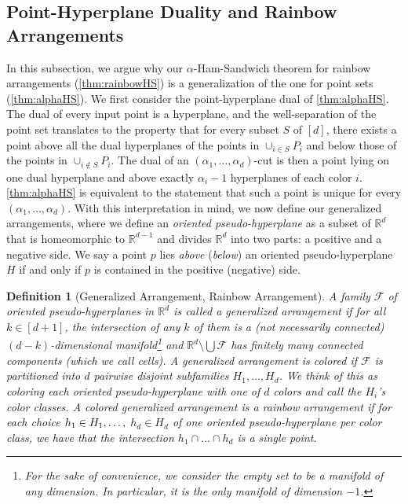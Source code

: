 \documentclass[11pt]{article}
\newtheorem{definition}[theorem]{Definition}
\newcommand{\R}{\mathbb{R}}
\begin{document}
\subsection{Point-Hyperplane Duality and Rainbow Arrangements}
\label{sec:rainbow_definition}
%
In this subsection, we argue why our $\alpha$-Ham-Sandwich theorem for rainbow arrangements (\cref{thm:rainbowHS}) is a generalization of the one for point sets (\cref{thm:alphaHS}).
We first consider the point-hyperplane dual of \cref{thm:alphaHS}.
The dual of every input point is a hyperplane, and the well-separation of the point set translates to the property that for every subset $S$ of $[d]$, there exists a point above all the dual hyperplanes of the points in $\cup_{i \in S} P_i$ and below those of the points in $\cup_{i \notin S} P_i$.
The dual of an $(\alpha_1, \dots, \alpha_d)$-cut is then a point lying on one dual hyperplane and above exactly $\alpha_i-1$ hyperplanes of each color $i$.
\cref{thm:alphaHS} is equivalent to the statement that such a point is unique for every $(\alpha_1, \dots, \alpha_d)$.
%
With this interpretation in mind, we now define our generalized arrangements, where we define an \emph{oriented pseudo-hyperplane} as a subset of $\R^d$ that is homeomorphic to $\R^{d - 1}$ and divides $\R^d$ into two parts: a positive and a negative side. We say a point $p$ lies \emph{above} (\emph{below}) an oriented pseudo-hyperplane $H$ if and only if $p$ is contained in the positive (negative) side.
%
\begin{definition}[Generalized Arrangement, Rainbow Arrangement]
\label{def:generalized_arrangments}
A family $\mathcal{F}$ of oriented pseudo-hyperplanes in $\mathbb{R}^d$ is called a \emph{generalized arrangement} if for all $k \in [d + 1]$, the intersection of any $k$ of them is a (not necessarily connected) $(d-k)$-dimensional manifold\footnote{For the sake of convenience, we consider the empty set to be a manifold of any dimension. In particular, it is the only manifold of dimension $-1$.} and $\mathbb{R}^d\setminus\bigcup\mathcal{F}$ has finitely many connected components (which we call \emph{cells}).
%
A generalized arrangement is \emph{colored} if $\mathcal{F}$ is partitioned into $d$ pairwise disjoint subfamilies $H_1,\ldots,H_d$. We think of this as coloring each oriented pseudo-hyperplane with one of $d$ colors and call the $H_i$'s \emph{color classes}.
%
A colored generalized arrangement is a \emph{rainbow arrangement} if for each choice $h_1\in \nolinebreak H_1,\ldots,$ $h_d\in H_d$ of one oriented pseudo-hyperplane per color class, we have that the intersection $h_1\cap\ldots\cap h_d$ is a single point.
\end{definition}
\end{document}
